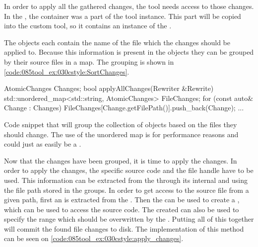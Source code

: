 In order to apply all the gathered changes, the tool needs access to those changes. In the , the  container was a part of the tool instance. This part will be copied into the custom tool, so it contains an instance of the . 

The  objects each contain the name of the file which the changes should be applied to. Because this information is present in the objects they can be grouped by their source files in a map. The grouping is shown in \cref{code:085tool_ex:030cstyle:SortChanges}.

\begin{listing}[H]
    \begin{cppcode}
AtomicChanges Changes;
bool applyAllChanges(Rewriter &Rewrite) {
    std::unordered_map<std::string, AtomicChanges> FileChanges;
    for (const auto& Change : Changes) {
        FileChanges[Change.getFilePath()].push_back(Change);
    }
    ...
}
    \end{cppcode}
    \caption{Code snippet that will group the collection of  objects based on the files they should change. The use of the unordered map is for performance reasons and could just as easily be a .}
    \label{code:085tool_ex:030cstyle:SortChanges}
\end{listing}

Now that the changes have been grouped, it is time to apply the changes. In order to apply the changes, the specific source code and the file handle have to be used. This information can be extracted from the  through its internal  and  using the file path stored in the groups. In order to get access to the source file from a given path, first an  is extracted from the . Then the  can be used to create a , which can be used to access the source code. The created  can also be used to specify the range which should be overwritten by the . Putting all of this together will commit the found file changes to disk. The implementation of this method can be seen on \cref{code:085tool_ex:030cstyle:apply_changes}.

